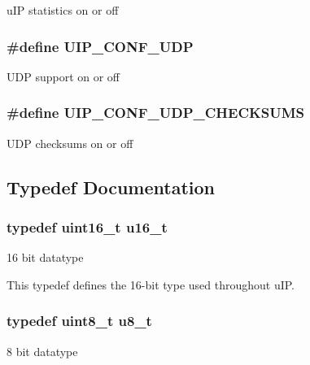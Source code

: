 u\+I\+P statistics on or off \hypertarget{group__uipopt_ga763f12007aad8cc0e483bf50f8a8d9b4}{
\subsubsection[{U\+I\+P\+\_\+\+C\+O\+N\+F\+\_\+\+U\+D\+P}]{\setlength{\rightskip}{0pt plus 5cm}\#define U\+I\+P\+\_\+\+C\+O\+N\+F\+\_\+\+U\+D\+P}}\label{group__uipopt_ga763f12007aad8cc0e483bf50f8a8d9b4}
U\+D\+P support on or off \hypertarget{group__uipopt_ga9dd44616d41cef74d3beb51d8be5ecec}{
\subsubsection[{U\+I\+P\+\_\+\+C\+O\+N\+F\+\_\+\+U\+D\+P\+\_\+\+C\+H\+E\+C\+K\+S\+U\+M\+S}]{\setlength{\rightskip}{0pt plus 5cm}\#define U\+I\+P\+\_\+\+C\+O\+N\+F\+\_\+\+U\+D\+P\+\_\+\+C\+H\+E\+C\+K\+S\+U\+M\+S}}\label{group__uipopt_ga9dd44616d41cef74d3beb51d8be5ecec}
U\+D\+P checksums on or off 

\subsection{Typedef Documentation}
\hypertarget{group__uipopt_ga77570ac4fcab86864fa1916e55676da2}{
\subsubsection[{u16\+\_\+t}]{\setlength{\rightskip}{0pt plus 5cm}typedef uint16\+\_\+t {\bf u16\+\_\+t}}}\label{group__uipopt_ga77570ac4fcab86864fa1916e55676da2}
16 bit datatype

This typedef defines the 16-\/bit type used throughout u\+I\+P. \hypertarget{group__uipopt_ga4caecabca98b43919dd11be1c0d4cd8e}{
\subsubsection[{u8\+\_\+t}]{\setlength{\rightskip}{0pt plus 5cm}typedef uint8\+\_\+t {\bf u8\+\_\+t}}}\label{group__uipopt_ga4caecabca98b43919dd11be1c0d4cd8e}
8 bit datatype

